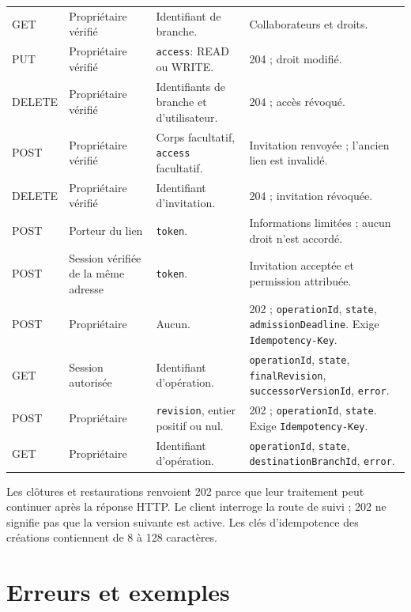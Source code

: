 \begin{longtable}{@{}L{31mm}L{23mm}L{34mm}L{47mm}@{}}
GET  & Propriétaire vérifié & Identifiant de branche. & Collaborateurs et droits. \\
PUT  & Propriétaire vérifié & \texttt{access}: READ ou WRITE. & 204 ; droit modifié. \\
DELETE  & Propriétaire vérifié & Identifiants de branche et d'utilisateur. & 204 ; accès révoqué. \\
POST  & Propriétaire vérifié & Corps facultatif, \texttt{access} facultatif. & Invitation renvoyée ; l'ancien lien est invalidé. \\
DELETE  & Propriétaire vérifié & Identifiant d'invitation. & 204 ; invitation révoquée. \\
POST  & Porteur du lien & \texttt{token}. & Informations limitées ; aucun droit n'est accordé. \\
POST  & Session vérifiée de la même adresse & \texttt{token}. & Invitation acceptée et permission attribuée. \\
POST  & Propriétaire & Aucun. & 202 ; \texttt{operationId}, \texttt{state}, \texttt{admissionDeadline}. Exige \texttt{Idempotency-Key}. \\
GET  & Session autorisée & Identifiant d'opération. & \texttt{operationId}, \texttt{state}, \texttt{finalRevision}, \texttt{successorVersionId}, \texttt{error}. \\
POST  & Propriétaire & \texttt{revision}, entier positif ou nul. & 202 ; \texttt{operationId}, \texttt{state}. Exige \texttt{Idempotency-Key}. \\
GET  & Propriétaire & Identifiant d'opération. & \texttt{operationId}, \texttt{state}, \texttt{destinationBranchId}, \texttt{error}. \\
\bottomrule
\end{longtable}
\endgroup

Les clôtures et restaurations renvoient 202 parce que leur traitement peut continuer après la réponse HTTP. Le client interroge la route de suivi ; 202 ne signifie pas que la version suivante est active. Les clés d'idempotence des créations contiennent de 8 à 128 caractères.

\section{Erreurs et exemples}

